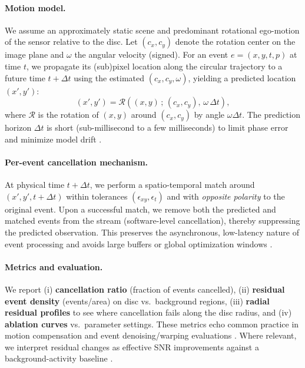 \paragraph{Motion model.}
We assume an approximately static scene and predominant rotational ego-motion of the sensor relative to the disc. Let $(c_x,c_y)$ denote the rotation center on the image plane and $\omega$ the angular velocity (signed). For an event $e=(x,y,t,p)$ at time $t$, we propagate its (sub)pixel location along the circular trajectory to a future time $t+\Delta t$ using the estimated $(c_x,c_y,\omega)$, yielding a predicted location $(x',y')$:
\[
(x',y') = \mathcal{R}\!\left((x,y)\,;\,(c_x,c_y),\,\omega\,\Delta t\right),
\]
where $\mathcal{R}$ is the rotation of $(x,y)$ around $(c_x,c_y)$ by angle $\omega \Delta t$. The prediction horizon $\Delta t$ is short (sub-millisecond to a few milliseconds) to limit phase error and minimize model drift \cite{Gallego2017Angular,Gallego2018CMax}.

\paragraph{Per-event cancellation mechanism.}
At physical time $t+\Delta t$, we perform a spatio-temporal match around $(x',y',t+\Delta t)$ within tolerances $(\epsilon_{xy},\epsilon_{t})$ and with \emph{opposite polarity} to the original event. Upon a successful match, we remove both the predicted and matched events from the stream (software-level cancellation), thereby suppressing the predicted observation. This preserves the asynchronous, low-latency nature of event processing and avoids large buffers or global optimization windows \cite{Bardow2016SOFIE,Gallego2018CMax}.

\paragraph{Metrics and evaluation.}
We report (i) \textbf{cancellation ratio} (fraction of events cancelled), (ii) \textbf{residual event density} (events/area) on disc vs.\ background regions, (iii) \textbf{radial residual profiles} to see where cancellation fails along the disc radius, and (iv) \textbf{ablation curves} vs.\ parameter settings. These metrics echo common practice in motion compensation and event denoising/warping evaluations \cite{Bardow2016SOFIE,Gallego2018CMax,Xu2020TCI}. Where relevant, we interpret residual changes as effective SNR improvements against a background-activity baseline \cite{Gallego2020Survey}.

